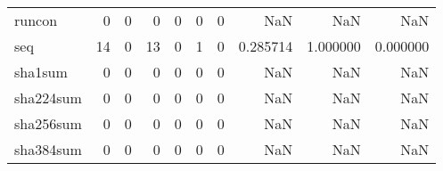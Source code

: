 \begin{longtable}{lrrrrrrrrr}
runcon    &                                                  0 &                                                  0 &                                                  0 &                                                  0 &                                                  0 &                                                  0 &                                                NaN &                                    NaN &                                  NaN \\
seq       &                                                 14 &                                                  0 &                                                 13 &                                                  0 &                                                  1 &                                                  0 &                                           0.285714 &                               1.000000 &                             0.000000 \\
sha1sum   &                                                  0 &                                                  0 &                                                  0 &                                                  0 &                                                  0 &                                                  0 &                                                NaN &                                    NaN &                                  NaN \\
sha224sum &                                                  0 &                                                  0 &                                                  0 &                                                  0 &                                                  0 &                                                  0 &                                                NaN &                                    NaN &                                  NaN \\
sha256sum &                                                  0 &                                                  0 &                                                  0 &                                                  0 &                                                  0 &                                                  0 &                                                NaN &                                    NaN &                                  NaN \\
sha384sum &                                                  0 &                                                  0 &                                                  0 &                                                  0 &                                                  0 &                                                  0 &                                                NaN &                                    NaN &                                  NaN \\

\end{longtable}
